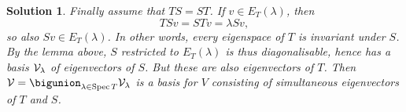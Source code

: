 \documentclass[article, a4paper, 11pt, oneside]{memoir}
\numberwithin{equation}{chapter}
\theoremstyle{nonumberplain}
\newtheorem{solution}{Solution}
\begin{document}
\begin{solution}
    Finally assume that $TS = ST$. If $v \in E_T(\lambda)$, then
    \begin{equation*}
        TSv
            = STv
            = \lambda Sv,
    \end{equation*}
    so also $Sv \in E_T(\lambda)$. In other words, every eigenspace of $T$ is invariant under $S$. By the lemma above, $S$ restricted to $E_T(\lambda)$ is thus diagonalisable, hence has a basis $\mathcal{V}_\lambda$ of eigenvectors of $S$. But these are also eigenvectors of $T$. Then $\calV = \bigunion_{\lambda \in \spec T} \calV_\lambda$ is a basis for $V$ consisting of simultaneous eigenvectors of $T$ and $S$.
\end{solution}
\end{document}
